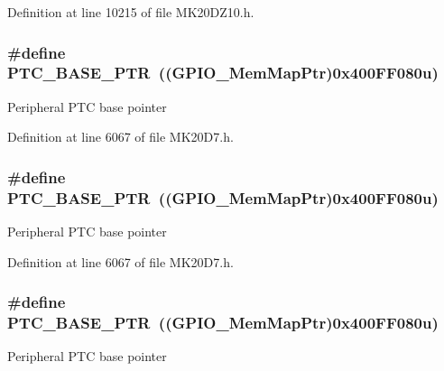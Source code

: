 Definition at line 10215 of file M\+K20\+D\+Z10.\+h.

\subsubsection[{\texorpdfstring{P\+T\+C\+\_\+\+B\+A\+S\+E\+\_\+\+P\+TR}{PTC_BASE_PTR}}]{\setlength{\rightskip}{0pt plus 5cm}\#define P\+T\+C\+\_\+\+B\+A\+S\+E\+\_\+\+P\+TR~(({\bf G\+P\+I\+O\+\_\+\+Mem\+Map\+Ptr})0x400\+F\+F080u)}\hypertarget{group___g_p_i_o___peripheral_gaaa3dc05c2a51a960067e1de6863fd3dd}{}\label{group___g_p_i_o___peripheral_gaaa3dc05c2a51a960067e1de6863fd3dd}
Peripheral P\+TC base pointer 

Definition at line 6067 of file M\+K20\+D7.\+h.

\subsubsection[{\texorpdfstring{P\+T\+C\+\_\+\+B\+A\+S\+E\+\_\+\+P\+TR}{PTC_BASE_PTR}}]{\setlength{\rightskip}{0pt plus 5cm}\#define P\+T\+C\+\_\+\+B\+A\+S\+E\+\_\+\+P\+TR~(({\bf G\+P\+I\+O\+\_\+\+Mem\+Map\+Ptr})0x400\+F\+F080u)}\hypertarget{group___g_p_i_o___peripheral_gaaa3dc05c2a51a960067e1de6863fd3dd}{}\label{group___g_p_i_o___peripheral_gaaa3dc05c2a51a960067e1de6863fd3dd}
Peripheral P\+TC base pointer 

Definition at line 6067 of file M\+K20\+D7.\+h.

\subsubsection[{\texorpdfstring{P\+T\+C\+\_\+\+B\+A\+S\+E\+\_\+\+P\+TR}{PTC_BASE_PTR}}]{\setlength{\rightskip}{0pt plus 5cm}\#define P\+T\+C\+\_\+\+B\+A\+S\+E\+\_\+\+P\+TR~(({\bf G\+P\+I\+O\+\_\+\+Mem\+Map\+Ptr})0x400\+F\+F080u)}\hypertarget{group___g_p_i_o___peripheral_gaaa3dc05c2a51a960067e1de6863fd3dd}{}\label{group___g_p_i_o___peripheral_gaaa3dc05c2a51a960067e1de6863fd3dd}
Peripheral P\+TC base pointer 

